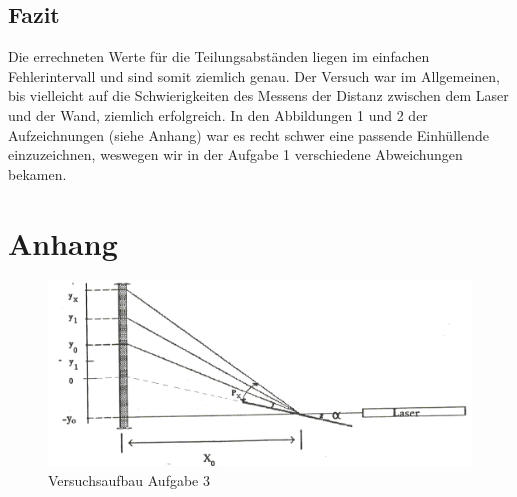 \documentclass{article}
\begin{document}
\subsection{Fazit}

Die errechneten Werte für die Teilungsabständen liegen im einfachen Fehlerintervall und sind somit ziemlich genau. Der Versuch war im Allgemeinen, bis vielleicht auf die Schwierigkeiten des Messens der Distanz zwischen dem Laser und der Wand, ziemlich erfolgreich. In den Abbildungen 1 und 2 der Aufzeichnungen (siehe Anhang) war es recht schwer eine passende Einhüllende einzuzeichnen, weswegen wir in der Aufgabe 1 verschiedene Abweichungen bekamen.

\newpage
\section{Anhang}

\begin{figure}[htbp]
\centering
\includegraphics[scale=0.3]{BEU6.png}
\begin{center}
\caption{Versuchsaufbau Aufgabe 3}
\end{center}
\end{figure}
\end{document}
